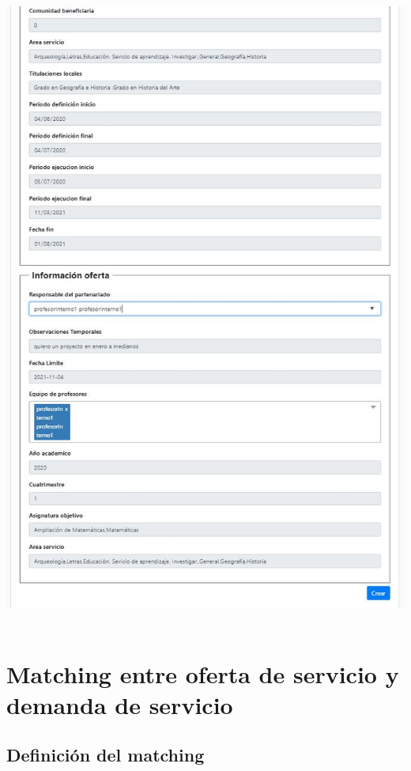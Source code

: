 \documentclass[11pt]{article}
\begin{document}
 \includegraphics[width=\textwidth]{partenariado2}
 \\\\
 
 \section{Matching entre oferta de servicio y demanda de servicio}
 
 \subsection{Definición del matching }
\end{document}
